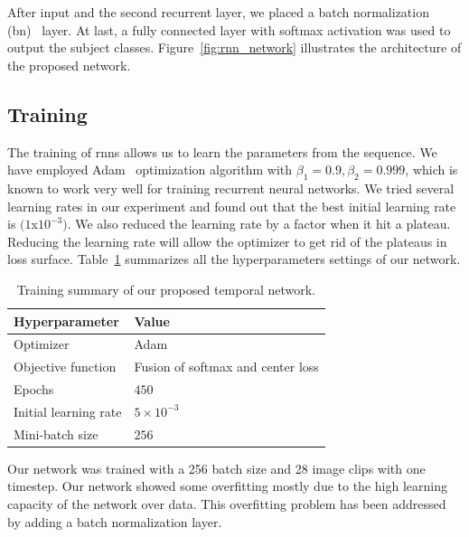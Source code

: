 After input and the second recurrent layer, we placed a batch normalization (\gls{bn})~\cite{Ioffe_15} layer. At last, a fully connected layer with softmax activation was used to output the subject classes. Figure~\ref{fig:rnn_network} illustrates the architecture of the proposed network. 


\subsection{Training}
The training of \gls{rnn}s allows us to learn the parameters from the sequence. We have employed Adam~\cite{Kingma_15} optimization algorithm with $\beta_1 = 0.9, \beta_2 = 0.999$, which is known to work very well for training recurrent neural networks. We tried several learning rates in our experiment and found out that the best initial learning rate is $(1$x$10^{-3})$. We also reduced the learning rate by a factor when it hit a plateau. Reducing the learning rate will allow the optimizer to get rid of the plateaus in loss surface. Table~\ref{table:summary_tn} summarizes all the hyperparameters settings of our network.

\begin{table}
	\centering
	\caption{Training summary of our proposed temporal network. \label{table:summary_tn}}
	\begin{tabular*}{32pc}{@{\extracolsep{\fill}}ll@{}}
			\hline \noalign{\vspace{3pt}}
			\textbf{Hyperparameter} &\qquad \textbf{Value} \\ [3pt] \hline\noalign{\vspace{3pt}}
			Optimizer     			&\qquad Adam~\cite{Kingma_15} \\[3pt]
			Objective function  	&\qquad Fusion of softmax and center loss \\[3pt]
			Epochs        			&\qquad $ 450 $ \\ [3pt]
			Initial learning rate	&\qquad $5 \times 10^{-3}$  \\[3pt]
			Mini-batch size			&\qquad $ 256 $ \\
			\hline
	\end{tabular*}
\end{table}

Our network was trained with a 256 batch size and 28 image clips with one timestep. Our network showed some overfitting mostly due to the high learning capacity of the network over data. This overfitting problem has been addressed by adding a batch normalization layer. 


